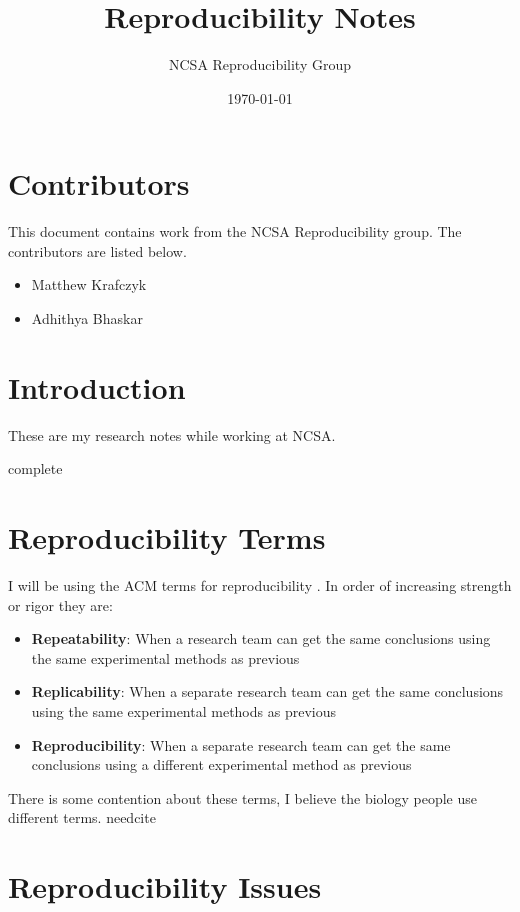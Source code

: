 \documentclass[american]{article}
\title{Reproducibility Notes}
\author{NCSA Reproducibility Group}
\date{\today}
\newcommand{\complete}{
	\gls{complete}
}
\newcommand{\needcite}{
	\gls{needcite}
}
\begin{document}
\maketitle

\tableofcontents

\section{Contributors} \label{sec:contributors}

This document contains work from the NCSA Reproducibility group. The contributors are listed below.

\begin{itemize}
\item Matthew Krafczyk
\item Adhithya Bhaskar
\end{itemize}

\section{Introduction} \label{sec:introduction}

These are my research notes while working at NCSA.

\complete

\section{Reproducibility Terms} \label{sec:reproducibility-terms}

I will be using the ACM terms for reproducibility \cite{acm-badging}. In order of increasing strength or rigor they are:

\begin{itemize}
\item \textbf{Repeatability}: When a research team can get the same conclusions using the same experimental methods as previous
\item \textbf{Replicability}: When a separate research team can get the same conclusions using the same experimental methods as previous
\item \textbf{Reproducibility}: When a separate research team can get the same conclusions using a different experimental method as previous
\end{itemize}

There is some contention about these terms, I believe the biology people use different terms. \needcite

\section{Reproducibility Issues} \label{sec:reproducibility-issues}
\end{document}
